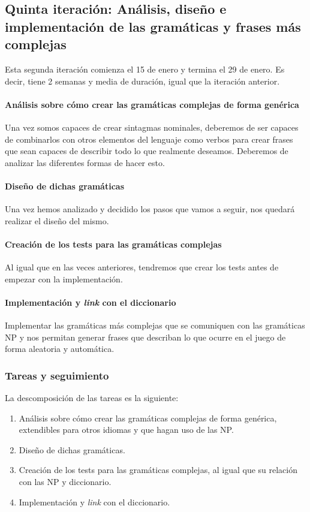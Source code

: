 \subsection{Quinta iteración: Análisis, diseño e implementación de las gramáticas y frases más complejas}

Esta segunda iteración comienza el 15 de enero y termina el 29 de enero. Es decir, tiene 2 semanas y media de duración, igual que la iteración anterior.

\paragraph{Análisis sobre cómo crear las gramáticas complejas de forma genérica} Una vez somos capaces de crear sintagmas nominales, deberemos de ser capaces de combinarlos con otros elementos del lenguaje como verbos para crear frases que sean capaces de describir todo lo que realmente deseamos. Deberemos de analizar las diferentes formas de hacer esto.

\paragraph{Diseño de dichas gramáticas} Una vez hemos analizado y decidido los pasos que vamos a seguir, nos quedará realizar el diseño del mismo.

\paragraph{Creación de los tests para las gramáticas complejas} Al igual que en las veces anteriores, tendremos que crear los tests antes de empezar con la implementación.

\paragraph{Implementación y \textit{link} con el diccionario} Implementar las gramáticas más complejas que se comuniquen con las gramáticas NP y nos permitan generar frases que describan lo que ocurre en el juego de forma aleatoria y automática.

\subsubsection{Tareas y seguimiento}

La descomposición de las tareas es la siguiente:

\begin{enumerate}[label=\bfseries WBS 5.\arabic*]
  \item Análisis sobre cómo crear las gramáticas complejas de forma genérica, extendibles para otros idiomas y que hagan uso de las NP.
  \item Diseño de dichas gramáticas.
  \item Creación de los tests para las gramáticas complejas, al igual que su relación con las NP y diccionario.
  \item Implementación y \textit{link} con el diccionario.
\end{enumerate}

